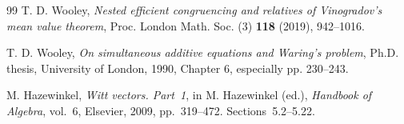 \documentclass[11pt]{amsart}
\theoremstyle{definition}
\numberwithin{equation}{section}
\begin{document}
\begin{thebibliography}{99}
T. D. Wooley, \emph{Nested efficient congruencing and relatives of
Vinogradov's mean value theorem}, Proc. London Math. Soc. (3)
\textbf{118} (2019), 942--1016.

T. D. Wooley, \emph{On simultaneous additive equations and Waring's problem},
Ph.D. thesis, University of London, 1990, Chapter 6, especially pp. 230--243.

M. Hazewinkel, \emph{Witt vectors. Part~1}, in M. Hazewinkel (ed.),
\emph{Handbook of Algebra}, vol.~6, Elsevier, 2009, pp.~319--472.
Sections~5.2--5.22.
\end{thebibliography}
\end{document}
